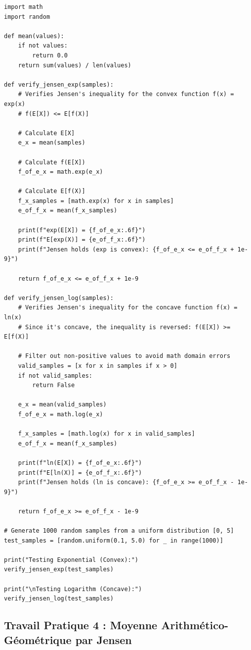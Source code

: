 \documentclass[11pt,a4paper]{article}
\begin{document}
\begin{lstlisting}
import math
import random

def mean(values):
    if not values:
        return 0.0
    return sum(values) / len(values)

def verify_jensen_exp(samples):
    # Verifies Jensen's inequality for the convex function f(x) = exp(x)
    # f(E[X]) <= E[f(X)]

    # Calculate E[X]
    e_x = mean(samples)

    # Calculate f(E[X])
    f_of_e_x = math.exp(e_x)

    # Calculate E[f(X)]
    f_x_samples = [math.exp(x) for x in samples]
    e_of_f_x = mean(f_x_samples)

    print(f"exp(E[X]) = {f_of_e_x:.6f}")
    print(f"E[exp(X)] = {e_of_f_x:.6f}")
    print(f"Jensen holds (exp is convex): {f_of_e_x <= e_of_f_x + 1e-9}")

    return f_of_e_x <= e_of_f_x + 1e-9

def verify_jensen_log(samples):
    # Verifies Jensen's inequality for the concave function f(x) = ln(x)
    # Since it's concave, the inequality is reversed: f(E[X]) >= E[f(X)]

    # Filter out non-positive values to avoid math domain errors
    valid_samples = [x for x in samples if x > 0]
    if not valid_samples:
        return False

    e_x = mean(valid_samples)
    f_of_e_x = math.log(e_x)

    f_x_samples = [math.log(x) for x in valid_samples]
    e_of_f_x = mean(f_x_samples)

    print(f"ln(E[X]) = {f_of_e_x:.6f}")
    print(f"E[ln(X)] = {e_of_f_x:.6f}")
    print(f"Jensen holds (ln is concave): {f_of_e_x >= e_of_f_x - 1e-9}")

    return f_of_e_x >= e_of_f_x - 1e-9

# Generate 1000 random samples from a uniform distribution [0, 5]
test_samples = [random.uniform(0.1, 5.0) for _ in range(1000)]

print("Testing Exponential (Convex):")
verify_jensen_exp(test_samples)

print("\nTesting Logarithm (Concave):")
verify_jensen_log(test_samples)
\end{lstlisting}


\subsection*{Travail Pratique 4 : Moyenne Arithmético-Géométrique par Jensen}
\end{document}
